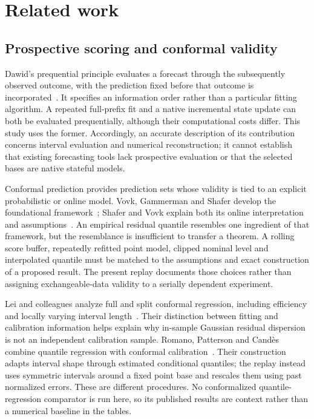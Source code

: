 \section{Related work}
\subsection{Prospective scoring and conformal validity}
Dawid's prequential principle evaluates a forecast through the subsequently observed outcome, with the prediction fixed before that outcome is incorporated~\cite{dawid1984}. It specifies an information order rather than a particular fitting algorithm. A repeated full-prefix fit and a native incremental state update can both be evaluated prequentially, although their computational costs differ. This study uses the former. Accordingly, an accurate description of its contribution concerns interval evaluation and numerical reconstruction; it cannot establish that existing forecasting tools lack prospective evaluation or that the selected bases are native stateful models.

Conformal prediction provides prediction sets whose validity is tied to an explicit probabilistic or online model. Vovk, Gammerman and Shafer develop the foundational framework~\cite{vovk2005}; Shafer and Vovk explain both its online interpretation and assumptions~\cite{shafer2008}. An empirical residual quantile resembles one ingredient of that framework, but the resemblance is insufficient to transfer a theorem. A rolling score buffer, repeatedly refitted point model, clipped nominal level and interpolated quantile must be matched to the assumptions and exact construction of a proposed result. The present replay documents those choices rather than assigning exchangeable-data validity to a serially dependent experiment.

Lei and colleagues analyze full and split conformal regression, including efficiency and locally varying interval length~\cite{lei2018}. Their distinction between fitting and calibration information helps explain why in-sample Gaussian residual dispersion is not an independent calibration sample. Romano, Patterson and Cand\`es combine quantile regression with conformal calibration~\cite{cqr2019}. Their construction adapts interval shape through estimated conditional quantiles; the replay instead uses symmetric intervals around a fixed point base and rescales them using past normalized errors. These are different procedures. No conformalized quantile-regression comparator is run here, so its published results are context rather than a numerical baseline in the tables.

